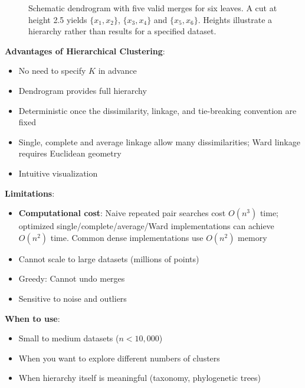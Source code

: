 \documentclass[11pt,twoside]{article}
\numberwithin{equation}{section}
\theoremstyle{plain}
\theoremstyle{definition}
\theoremstyle{remark}
\newenvironment{keyidea}{
  \begin{tcolorbox}[colback=yellow!5!white,
                    colframe=yellow!50!black,
                    title=Key Idea,
                    breakable,
                    enhanced,
                    sharp corners,
                    boxrule=0.8pt,
                    left=6pt, right=6pt, top=6pt, bottom=6pt]
}{
  \end{tcolorbox}
}
\begin{document}
\begin{figure}[H]
\centering
{}
\caption{Schematic dendrogram with five valid merges for six leaves. A cut at height 2.5 yields $\{x_1,x_2\}$, $\{x_3,x_4\}$ and $\{x_5,x_6\}$. Heights illustrate a hierarchy rather than results for a specified dataset.}
\end{figure}

\begin{keyidea}
\textbf{Advantages of Hierarchical Clustering}:
\begin{itemize}
\item No need to specify $K$ in advance
\item Dendrogram provides full hierarchy
\item Deterministic once the dissimilarity, linkage, and tie-breaking convention are fixed
\item Single, complete and average linkage allow many dissimilarities; Ward linkage requires Euclidean geometry
\item Intuitive visualization
\end{itemize}

\textbf{Limitations}:
\begin{itemize}
\item \textbf{Computational cost}: Naive repeated pair searches cost $O(n^3)$ time; optimized single/complete/average/Ward implementations can achieve $O(n^2)$ time. Common dense implementations use $O(n^2)$ memory
\item Cannot scale to large datasets (millions of points)
\item Greedy: Cannot undo merges
\item Sensitive to noise and outliers
\end{itemize}

\textbf{When to use}:
\begin{itemize}
\item Small to medium datasets ($n < 10,000$)
\item When you want to explore different numbers of clusters
\item When hierarchy itself is meaningful (taxonomy, phylogenetic trees)
\end{itemize}
\end{keyidea}
\end{document}
